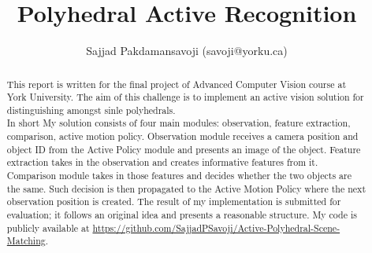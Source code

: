 \documentclass[crop=false]{standalone}
\begin{document}
\pagestyle{headings}
\mainmatter
\def\ECCVSubNumber{100}  %

\title{Polyhedral Active Recognition
} %

%
\author{Sajjad Pakdamansavoji (savoji@yorku.ca)
}

%
%
\maketitle



\begin{abstract}
This report is written for the final project of Advanced Computer Vision course at York University. The aim of this challenge is to implement an active vision solution for distinguishing amongst sinle polyhedrals.
\\ 

In short My solution consists of four main modules: observation, feature extraction, comparison, active motion policy. Observation module receives a camera position and object ID from the Active Policy module and presents an image of the object. Feature extraction takes in the observation and creates informative features from it. Comparison module takes in those features and decides whether the two objects are the same. Such decision is then propagated to the Active Motion Policy where the next observation position is created. The result of my implementation is submitted for evaluation; it follows an original idea and presents a reasonable structure. My code is publicly available at \url{https://github.com/SajjadPSavoji/Active-Polyhedral-Scene-Matching}.

\end{abstract}
\end{document}
